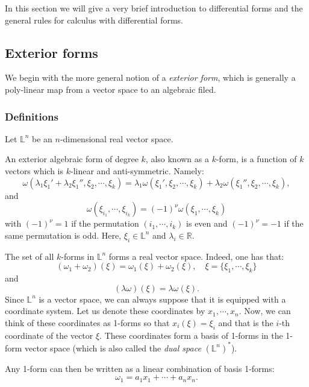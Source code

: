 In this section we will give a very brief introduction to differential forms
and the general rules for calculus with differential forms. 
\subsection{Exterior forms}
We begin with the more general notion of a \textit{exterior form}, which is
generally a poly-linear map from a vector space to an algebraic filed.
\subsubsection{Definitions}
Let $\mathbb{L}^n$ be an $n$-dimensional real vector space.
\begin{definition}
An exterior algebraic form of degree $k$, also known as a $k$-form, is
a function of $k$ vectors which is $k$-linear and anti-symmetric. Namely:
\begin{equation}
  \omega(\lambda_1\xi_1' + \lambda_2\xi_1'',\xi_2,\cdots,\xi_k)
  = \lambda_1\omega(\xi_1',\xi_2,\cdots,\xi_k)
  + \lambda_2\omega(\xi_1'',\xi_2,\cdots,\xi_k),
\end{equation}
and
\begin{equation}
  \omega(\xi_{i_1},\cdots,\xi_{i_k}) = (-1)^\nu\omega(\xi_1,\cdots,\xi_k)
\end{equation}
with $(-1)^\nu = 1$ if the permutation $(i_1,\cdots,i_k)$ is even and  $(-1)^\nu
= -1$ if the same permutation is odd. Here, $\xi_i\in\mathbb{L}^n$ and
$\lambda_i\in\mathbb{R}$.
\end{definition}
The set of all $k$-forms in $\mathbb{L}^n$ forms a real vector space. Indeed,
one has that:
\begin{equation}
   (\omega_1+\omega_2)(\xi) = \omega_1(\xi) + \omega_2(\xi), \quad \xi
   = \{\xi_1,\cdots,\xi_k\}
\end{equation}
and
\begin{equation}
  (\lambda\omega)(\xi) = \lambda\omega(\xi).
\end{equation}
Since $\mathbb{L}^n$ is a vector space, we can always suppose that it is
equipped with a coordinate system. Let us denote these coordinates by
$x_1,\cdots,x_n$. Now, we can think of these coordinates as 1-forms so that
$x_i(\xi) = \xi_i$ and that is the $i$-th coordinate of the vector $\xi$. These
coordinates form a basis of 1-forms in the 1-form vector space (which is also
called the \textit{dual space} $(\mathbb{L}^n)^*$).
\par Any 1-form can then be
written as a linear combination of basis 1-forms:
\begin{equation}
  \omega_1 = a_1x_1 + \cdots + a_nx_n.
\end{equation}

